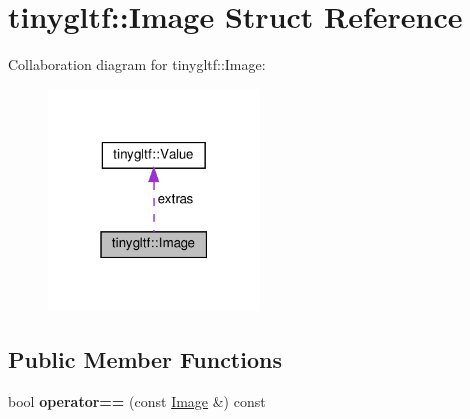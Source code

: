 \hypertarget{structtinygltf_1_1Image}{}\section{tinygltf\+:\+:Image Struct Reference}
\label{structtinygltf_1_1Image}


Collaboration diagram for tinygltf\+:\+:Image\+:\nopagebreak
\begin{figure}[H]
\begin{center}
\leavevmode
\includegraphics[width=159pt]{structtinygltf_1_1Image__coll__graph}
\end{center}
\end{figure}
\subsection*{Public Member Functions}
\begin{DoxyCompactItemize}
\item 
\mbox{\label{structtinygltf_1_1Image_a80cfdbbedf400bcf3129c7f8eba58aba}} 
bool {\bfseries operator==} (const \hyperlink{structtinygltf_1_1Image}{Image} \&) const
\end{DoxyCompactItemize}
